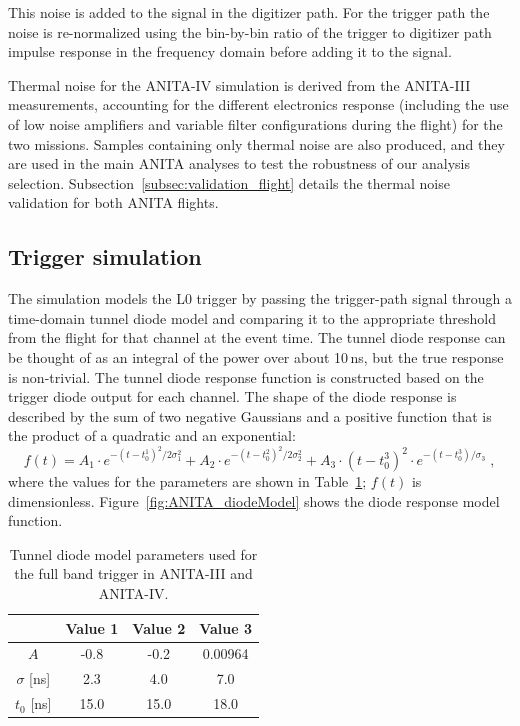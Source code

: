 This noise is added to the signal in the digitizer path.
For the trigger path the noise is re-normalized using the bin-by-bin ratio of the
trigger to digitizer path impulse response in the frequency domain
before adding it to the signal.

Thermal noise for the ANITA-IV simulation is derived from the ANITA-III measurements, accounting for the different electronics response (including the use of low noise amplifiers and variable filter configurations during the flight) for the two missions.
Samples containing only thermal noise are also produced, and they are used in
the main ANITA analyses to test the robustness of our analysis selection.
Subsection~\ref{subsec:validation_flight} details the thermal noise validation for both ANITA flights.


\subsection{Trigger simulation}
\label{subsec:ANITA_trigger}
The simulation models the L0 trigger by passing the
trigger-path signal through a time-domain tunnel diode model and comparing it to the
appropriate threshold from the flight for that channel at the event
time.
The tunnel diode response can be thought of as an integral of the power over about 10\,ns, but the true response is non-trivial.
The tunnel diode response function is constructed based on the trigger diode output for each channel.
The shape of the diode response is described by the sum of two negative Gaussians and a positive function that is the product of a quadratic and an exponential:
\begin{equation}
      f(t) = A_1 \cdot e^{-(t-t_0^1)^2/2\sigma_1^2} + 
      A_2 \cdot e^{-(t-t_0^2)^2/2\sigma_2^2} +
      A_3 \cdot \left( t-t_0^3 \right)^2 \cdot
      e^{-(t-t_0^3)/\sigma_3} \;,
    \end{equation}
\noindent where the values for the parameters are shown in
Table~\ref{tab:diodeModelParameters};
$f(t)$ is dimensionless.
Figure~\ref{fig:ANITA_diodeModel} shows the diode response model function.

\begin{table}[h!]
\caption{Tunnel diode model parameters used for the full band trigger in ANITA-III and ANITA-IV.}
  \begin{center}
    \begin{tabular}{c|c|c|c} 
      & Value 1 & Value 2 & Value 3 \\
     \hline
      $A$           & -0.8  & -0.2   &  0.00964   \\
      $\sigma$ [ns] &  2.3  &  4.0   &  7.0       \\ 
      $t_0$  [ns]   & 15.0  & 15.0   & 18.0       \\
    \end{tabular}
  \end{center}
  \label{tab:diodeModelParameters}
\end{table}


